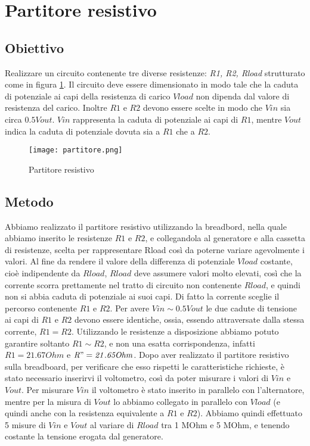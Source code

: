 \documentclass[a4paper]{article}
\begin{document}
\section{Partitore resistivo}
\subsection{Obiettivo}
Realizzare un circuito contenente tre diverse resistenze: \emph{R1, R2, Rload} strutturato come in figura \ref{fig:4}.
Il circuito deve essere dimensionato in modo tale che la caduta di potenziale ai capi della resistenza di carico \( \mathit{Vload} \) non dipenda dal valore di resistenza del carico.
Inoltre \( \mathit{R1} \) e \( \mathit{R2} \) devono essere scelte in modo che \( \mathit{Vin} \) sia circa \( \mathit{0.5 Vout} \).
\( \mathit{Vin} \) rappresenta la caduta di potenziale ai capi di \( \mathit{R1} \), mentre \( \mathit{Vout} \)indica la caduta di potenziale dovuta sia a \( \mathit{R1} \) che a \( \mathit{R2} \).
\begin{figure}[htbp]
	\centering
	\texttt{[image: partitore.png]}
	\caption{Partitore resistivo}
	\label{fig:4}
\end{figure}
\subsection{Metodo}
Abbiamo realizzato il partitore resistivo utilizzando la breadbord, nella quale abbiamo inserito le resistenze \( \mathit{R1} \) e \( \mathit{R2} \),
e collegandola al generatore e alla cassetta di resistenze, scelta per rappresentare Rload così da poterne variare agevolmente i valori.
Al fine da rendere il valore della differenza di potenziale \( \mathit{Vload} \) costante, cioè indipendente da \( \mathit{Rload} \),
\( \mathit{Rload} \) deve assumere valori molto elevati, così che la corrente scorra prettamente nel tratto di circuito non contenente \( \mathit{Rload} \), e quindi non si abbia caduta di potenziale ai suoi capi.
Di fatto la corrente sceglie il percorso contenente \( \mathit{R1} \) e \( \mathit{R2} \).
Per avere \( \mathit{Vin ∼ 0.5Vout} \) le due cadute di tensione ai capi di \( \mathit{R1} \) e \( \mathit{R2} \) devono essere identiche, ossia, essendo attraversate dalla stessa corrente, \( \mathit{R1=R2} \).
Utilizzando le resistenze a disposizione abbiamo potuto garantire soltanto \( \mathit{R1∼R2} \), e non una esatta corrispondenza, infatti \( \mathit{R1=21.67 Ohm} \) e \( \mathit{R"=21.65 Ohm} \).
Dopo aver realizzato il partitore resistivo sulla breadboard, per verificare che esso rispetti le caratteristiche richieste, è stato necessario inserirvi il voltometro,
così da poter misurare i valori di \( \mathit{Vin} \) e \( \mathit{Vout} \). Per misurare \( \mathit{Vin} \) il voltometro è stato inserito in parallelo con l'alternatore,
mentre per la misura di \( \mathit{Vout} \) lo abbiamo collegato in parallelo con \( \mathit{Vload} \) (e quindi anche con la resistenza equivalente a \( \mathit{R1} \) e \( \mathit{R2} \)).
Abbiamo quindi effettuato 5 misure di \( \mathit{Vin} \) e \( \mathit{Vout} \) al variare di \( \mathit{Rload} \) tra 1 MOhm e 5 MOhm, e tenendo costante la tensione erogata dal generatore.
\end{document}

